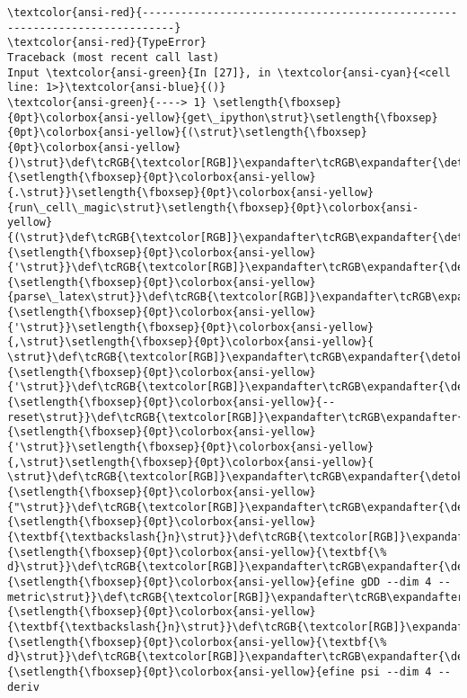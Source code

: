 \documentclass[landscape,letterpaper,10pt,english]{article}
\begin{document}
    \begin{Verbatim}[commandchars=\\\{\}, frame=single, framerule=2mm, rulecolor=\color{outerrorbackground}]
\textcolor{ansi-red}{---------------------------------------------------------------------------}
\textcolor{ansi-red}{TypeError}                                 Traceback (most recent call last)
Input \textcolor{ansi-green}{In [27]}, in \textcolor{ansi-cyan}{<cell line: 1>}\textcolor{ansi-blue}{()}
\textcolor{ansi-green}{----> 1} \setlength{\fboxsep}{0pt}\colorbox{ansi-yellow}{get\_ipython\strut}\setlength{\fboxsep}{0pt}\colorbox{ansi-yellow}{(\strut}\setlength{\fboxsep}{0pt}\colorbox{ansi-yellow}{)\strut}\def\tcRGB{\textcolor[RGB]}\expandafter\tcRGB\expandafter{\detokenize{98,98,98}}{\setlength{\fboxsep}{0pt}\colorbox{ansi-yellow}{.\strut}}\setlength{\fboxsep}{0pt}\colorbox{ansi-yellow}{run\_cell\_magic\strut}\setlength{\fboxsep}{0pt}\colorbox{ansi-yellow}{(\strut}\def\tcRGB{\textcolor[RGB]}\expandafter\tcRGB\expandafter{\detokenize{175,0,0}}{\setlength{\fboxsep}{0pt}\colorbox{ansi-yellow}{'\strut}}\def\tcRGB{\textcolor[RGB]}\expandafter\tcRGB\expandafter{\detokenize{175,0,0}}{\setlength{\fboxsep}{0pt}\colorbox{ansi-yellow}{parse\_latex\strut}}\def\tcRGB{\textcolor[RGB]}\expandafter\tcRGB\expandafter{\detokenize{175,0,0}}{\setlength{\fboxsep}{0pt}\colorbox{ansi-yellow}{'\strut}}\setlength{\fboxsep}{0pt}\colorbox{ansi-yellow}{,\strut}\setlength{\fboxsep}{0pt}\colorbox{ansi-yellow}{ \strut}\def\tcRGB{\textcolor[RGB]}\expandafter\tcRGB\expandafter{\detokenize{175,0,0}}{\setlength{\fboxsep}{0pt}\colorbox{ansi-yellow}{'\strut}}\def\tcRGB{\textcolor[RGB]}\expandafter\tcRGB\expandafter{\detokenize{175,0,0}}{\setlength{\fboxsep}{0pt}\colorbox{ansi-yellow}{--reset\strut}}\def\tcRGB{\textcolor[RGB]}\expandafter\tcRGB\expandafter{\detokenize{175,0,0}}{\setlength{\fboxsep}{0pt}\colorbox{ansi-yellow}{'\strut}}\setlength{\fboxsep}{0pt}\colorbox{ansi-yellow}{,\strut}\setlength{\fboxsep}{0pt}\colorbox{ansi-yellow}{ \strut}\def\tcRGB{\textcolor[RGB]}\expandafter\tcRGB\expandafter{\detokenize{175,0,0}}{\setlength{\fboxsep}{0pt}\colorbox{ansi-yellow}{"\strut}}\def\tcRGB{\textcolor[RGB]}\expandafter\tcRGB\expandafter{\detokenize{175,95,0}}{\setlength{\fboxsep}{0pt}\colorbox{ansi-yellow}{\textbf{\textbackslash{}n}\strut}}\def\tcRGB{\textcolor[RGB]}\expandafter\tcRGB\expandafter{\detokenize{175,95,135}}{\setlength{\fboxsep}{0pt}\colorbox{ansi-yellow}{\textbf{\% d}\strut}}\def\tcRGB{\textcolor[RGB]}\expandafter\tcRGB\expandafter{\detokenize{175,0,0}}{\setlength{\fboxsep}{0pt}\colorbox{ansi-yellow}{efine gDD --dim 4 --metric\strut}}\def\tcRGB{\textcolor[RGB]}\expandafter\tcRGB\expandafter{\detokenize{175,95,0}}{\setlength{\fboxsep}{0pt}\colorbox{ansi-yellow}{\textbf{\textbackslash{}n}\strut}}\def\tcRGB{\textcolor[RGB]}\expandafter\tcRGB\expandafter{\detokenize{175,95,135}}{\setlength{\fboxsep}{0pt}\colorbox{ansi-yellow}{\textbf{\% d}\strut}}\def\tcRGB{\textcolor[RGB]}\expandafter\tcRGB\expandafter{\detokenize{175,0,0}}{\setlength{\fboxsep}{0pt}\colorbox{ansi-yellow}{efine psi --dim 4 --deriv 
\end{Verbatim}
\end{document}
